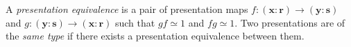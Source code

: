 A \textit{presentation equivalence} is a pair of presentation maps $f: (\mathbf{x} : \mathbf{r}) \to (\mathbf{y} : \mathbf{s})$ and $g: (\mathbf{y} : \mathbf{s}) \to (\mathbf{x} : \mathbf{r})$ such that $gf \simeq 1$ and $fg \simeq 1$. Two presentations are of the \textit{same type} if there exists a presentation equivalence between them.

